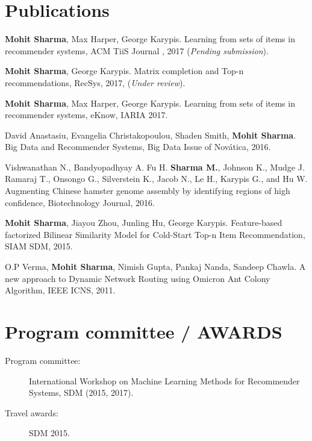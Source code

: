 \documentclass[a4paper,10pt]{article}
\begin{document}
\section{Publications}
\begin{description}

  \item \textbf{Mohit Sharma}, Max Harper, George Karypis. Learning from sets of items in
    recommender systems, ACM TiiS Journal , 2017 (\textit{Pending submission}).
  \item \textbf{Mohit Sharma}, George Karypis. Matrix completion and Top-n
  recommendations, RecSys, 2017, (\textit{Under review}).


  \item \textbf{Mohit Sharma}, Max Harper, George Karypis. Learning from sets of items in
    recommender systems, eKnow, IARIA 2017. 
  \item David Anastasiu, Evangelia Christakopoulou, Shaden Smith, \textbf{Mohit
    Sharma}. Big Data and Recommender Systems, Big Data Issue of Novática, 2016.
  \item Vishwanathan N., Bandyopadhyay A. Fu H. \textbf{Sharma M.},
    Johnson K., Mudge J. Ramaraj T., Onsongo G., Silverstein K., Jacob N., Le
    H., Karypis G., and Hu W. Augmenting Chinese hamster genome assembly by identifying
    regions of high confidence, Biotechnology Journal, 2016.
  \item \textbf{Mohit Sharma}, Jiayou Zhou, Junling Hu, George Karypis. Feature-based factorized Bilinear Similarity Model for
  Cold-Start Top-n Item Recommendation, SIAM SDM, 2015.
  \item O.P Verma, \textbf{Mohit Sharma}, Nimish Gupta, Pankaj Nanda, Sandeep
    Chawla. A new approach to Dynamic Network Routing using Omicron
  Ant Colony Algorithm, IEEE ICNS, 2011. 

\end{description}


\section{Program committee / AWARDS}
\begin{description}
  \item[Program committee: ] International Workshop on Machine Learning Methods
    for Recommender Systems, SDM (2015, 2017).
  \item[Travel awards: ] SDM 2015.
\end{description}
\end{document}
